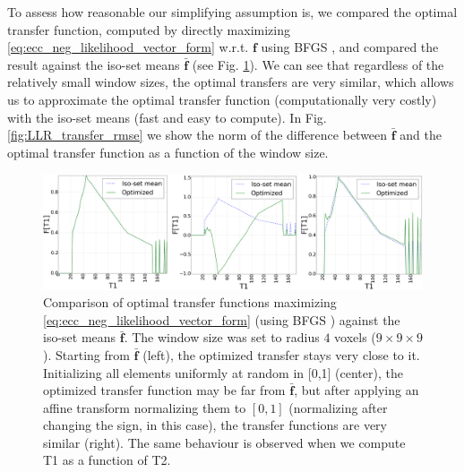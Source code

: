 To assess how reasonable our simplifying assumption is, we compared the optimal transfer function, computed by directly maximizing \eqref{eq:ecc_neg_likelihood_vector_form} w.r.t. $\mathbf{f}$ using BFGS \cite{GVK502988711}, and compared the result against the iso-set means $\mathbf{\bar{f}}$ (see Fig. \ref{fig:comparison_optimal_transfers}). We can see that regardless of the relatively small window sizes, the optimal transfers are very similar, which allows us to approximate the optimal transfer function (computationally very costly) with the iso-set means (fast and easy to compute). In Fig. \ref{fig:LLR_transfer_rmse} we show the norm of the difference between $\mathbf{\bar{f}}$ and the optimal transfer function as a function of the window size. \\

\begin{figure}[t]
\centering
    \includegraphics[width=1.0\linewidth]{images/comparison_optimal_transfers_t1lab_3_centered.png}
    \caption{{\small Comparison of optimal transfer functions maximizing \eqref{eq:ecc_neg_likelihood_vector_form} (using BFGS \cite{GVK502988711}) against the iso-set means $\mathbf{\bar{f}}$. The window size was set to radius $4$ voxels ($9\times 9\times 9$). Starting from $\mathbf{\bar{f}}$ (left), the optimized transfer stays very close to it. Initializing all elements uniformly at random in [0,1] (center), the optimized transfer function may be far from $\mathbf{\bar{f}}$, but after applying an affine transform normalizing them to $[0,1]$ (normalizing after changing the sign, in this case), the transfer functions are very similar (right). The same behaviour is observed when we compute T1 as a function of T2.}}    
\label{fig:comparison_optimal_transfers}\figcloser
\end{figure}
